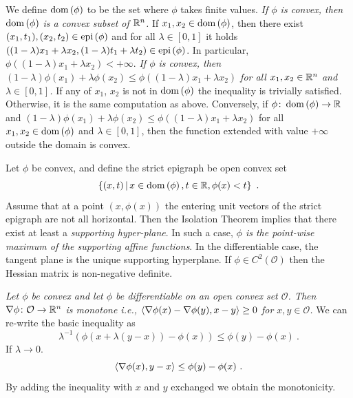 \documentclass[12pt,a4paper]{amsart}
\theoremstyle{plain}%
\theoremstyle{definition}
\theoremstyle{remark}
\begin{document}
We define $\operatorname{dom}\left(\phi\right)$ to be the set where $\phi$ takes finite values. \emph{If $\phi$ is convex, then $\operatorname{dom}\left(\phi\right)$ is a convex subset of $\mathbb{R}^n$.} If $x_1,x_2 \in \operatorname{dom}\left(\phi\right)$, then there exist $(x_1,t_1), (x_2,t_2) \in \operatorname{epi}\left(\phi\right)$ and for all $\lambda \in [0,1]$ it holds $((1-\lambda)x_1+\lambda x_2,(1-\lambda)t_1+\lambda t_2) \in \operatorname{epi}\left(\phi\right)$. In particular, $\phi((1-\lambda)x_1+\lambda x_2) < + \infty$. \emph{If $\phi$ is  convex, then $(1-\lambda)\phi(x_1) + \lambda \phi(x_2) \leq \phi((1-\lambda)x_1+\lambda x_2)$ for all $x_1,x_2 \in \mathbb{R}^n$ and $\lambda \in [0,1]$.} If any of $x_1$, $x_2$ is not in $\operatorname{dom}\left(\phi\right)$ the inequality is trivially satisfied. Otherwise, it is the same computation as above. Conversely, if $\phi \colon \operatorname{dom}\left(\phi\right) \to \mathbb{R}$ and $(1-\lambda)\phi(x_1) + \lambda \phi(x_2) \leq \phi((1-\lambda)x_1+\lambda x_2)$ for all $x_1,x_2 \in \operatorname{dom}\left(\phi\right)$ and $\lambda \in [0,1]$, then the function extended with value $+\infty$ outside the domain is convex.

Let $\phi$ be convex, and define the strict epigraph be open convex set
\begin{equation*}
\left\{(x,t) \, \middle| \,  x \in \operatorname{dom}\left(\phi\right), t \in \mathbb{R}, \phi(x) < t \right\} \ .
\end{equation*}
Assume that at a point $(x,\phi(x))$ the entering unit vectors of the strict epigraph are not all horizontal. Then the Isolation Theorem implies that there exist at least a \emph{supporting hyper-plane}. In such a case, \emph{$\phi$ is the point-wise maximum of the supporting affine functions}. In the differentiable case, the tangent plane is the unique supporting hyperplane. If $\phi \in C^2(\mathcal O)$ then the Hessian matrix is non-negative definite.

\emph{Let $\phi$ be convex and let $\phi$ be differentiable on an open convex set $\mathcal O$. Then $\nabla \phi \colon \mathcal O \to \mathbb{R}^n$ is \emph{monotone} i.e., $\left\langle\nabla \phi(x) - \nabla \phi(y),x-y\right\rangle \geq 0$ for $x,y \in \mathcal O$.} We can re-write the basic inequality as
\begin{equation*}
  \lambda^{-1}\left(\phi(x + \lambda(y-x))-\phi(x)\right) \leq \phi(y) - \phi(x) \ . 
\end{equation*}
If $\lambda \to 0$.
\begin{equation*}
  \left\langle\nabla \phi(x),y-x\right\rangle \leq \phi(y) - \phi(x) \ .
\end{equation*}
By adding the inequality with $x$ and $y$ exchanged we obtain the monotonicity.
\end{document}
